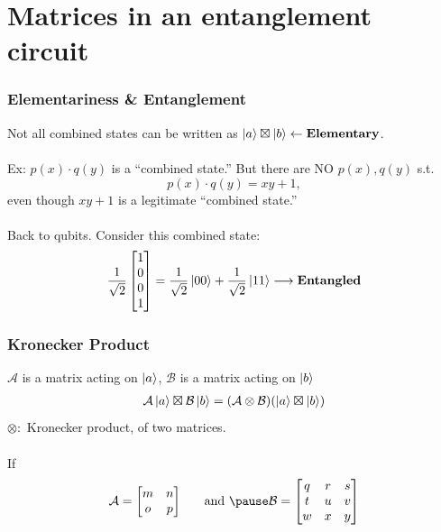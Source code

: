 \documentclass{beamer}
\theoremstyle{definition}
\newcommand{\A}{\mathcal{A}}
\newcommand{\B}{\mathcal{B}}
\begin{document}
\section{Matrices in an entanglement circuit}

\begin{frame}
\frametitle{Elementariness \& Entanglement}
\pause
Not all combined states can be written as $ \left\vert{a}\right\rangle\boxtimes \left\vert{b}\right\rangle \leftarrow \textbf{Elementary}$.\\
$\,$\\
\pause
Ex: $p(x)\cdot q(y)$ is a ``combined state.'' But there are NO $p(x), q(y)$ s.t. $$p(x)\cdot q(y) = xy + 1,$$ even though $xy + 1$ is a legitimate ``combined state.''\\
\pause
$\,$\\
Back to qubits. Consider this combined state:
\begin{align*}
\frac{1}{\sqrt{2}}\begin{bmatrix}
1\\0\\0\\1
\end{bmatrix} = \frac{1}{\sqrt{2}}\left\vert{00}\right\rangle + \frac{1}{\sqrt{2}}\left\vert{11}\right\rangle \longrightarrow \textbf{Entangled}
\end{align*}

\end{frame}


\begin{frame}
\frametitle{Kronecker Product}
\pause
$\A$ is a matrix acting on $\left\vert{a}\right\rangle$, $\B$ is a matrix acting on $\left\vert{b}\right\rangle$ 
\pause
\begin{align*}
\A\ket{a} \boxtimes \mathcal{B}\ket{b} = (\A \otimes \mathcal{B})(\ket{a} \boxtimes \ket{b})
\end{align*}
\pause
$\otimes:$ Kronecker product, of two matrices. \\
\pause
$\,$\\
If
\begin{align*}
\A = \begin{bmatrix}
m & n \\ o & p
\end{bmatrix}
\hspace{0.5cm}\text{ and }
\pause
\mathcal{B} = \begin{bmatrix}
q & r & s \\ t & u & v \\ w&x&y
\end{bmatrix}
\end{align*} 
\end{frame}
\end{document}
